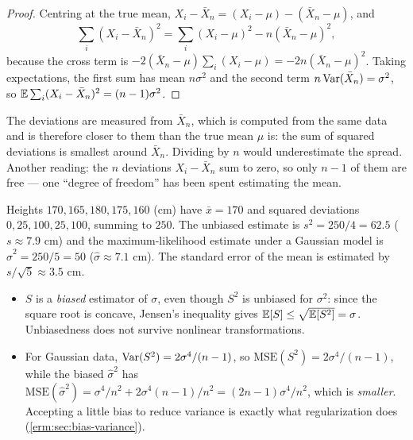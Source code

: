 \begin{notechapter}
\begin{proof}
Centring at the true mean, $X_i - \bar X_n = (X_i - \mu) - (\bar X_n - \mu)$, and
\[
  \sum_i(X_i - \bar X_n)^2 = \sum_i(X_i - \mu)^2 - n(\bar X_n - \mu)^2,
\]
because the cross term is $-2(\bar X_n - \mu)\sum_i(X_i - \mu) = -2n(\bar X_n - \mu)^2$.
Taking expectations, the first sum has mean $n\sigma^2$ and the second term
$n\operatorname{Var}(\bar X_n) = \sigma^2$, so $\mathbb{E}\sum_i(X_i - \bar X_n)^2 = (n-1)\sigma^2$.
\end{proof}

\begin{intuition}[Why $n - 1$?]
The deviations are measured from $\bar X_n$, which is computed from the same
data and is therefore closer to them than the true mean $\mu$ is: the sum of
squared deviations is smallest around $\bar X_n$. Dividing by $n$ would
underestimate the spread. Another reading: the $n$ deviations
$X_i - \bar X_n$ sum to zero, so only $n-1$ of them are free --- one
``degree of freedom'' has been spent estimating the mean.
\end{intuition}

\begin{example}\label{stats-and-proba:ex:five}
Heights $170, 165, 180, 175, 160$ (cm) have $\bar x = 170$ and squared
deviations $0, 25, 100, 25, 100$, summing to $250$. The unbiased estimate is
$s^2 = 250/4 = 62.5$ ($s\approx7.9$ cm) and the maximum-likelihood estimate
under a Gaussian model is $\hat\sigma^2 = 250/5 = 50$ ($\hat\sigma\approx7.1$ cm).
The standard error of the mean is estimated by $s/\sqrt5\approx3.5$ cm.
\end{example}

\begin{pitfall}
\begin{itemize}[nosep]
  \item $S$ is a \emph{biased} estimator of $\sigma$, even though $S^2$ is
        unbiased for $\sigma^2$: since the square root is concave, Jensen's
        inequality gives $\mathbb{E}[S]\leq\sqrt{\mathbb{E}[S^2]} = \sigma$. Unbiasedness does
        not survive nonlinear transformations.
  \item For Gaussian data, $\operatorname{Var}(S^2) = 2\sigma^4/(n-1)$, so
        $\mathrm{MSE}(S^2) = 2\sigma^4/(n-1)$, while the biased $\hat\sigma^2$
        has $\mathrm{MSE}(\hat\sigma^2) = \sigma^4/n^2 + 2\sigma^4(n-1)/n^2 = (2n-1)\sigma^4/n^2$,
        which is \emph{smaller}. Accepting a little bias to reduce variance is
        exactly what regularization does (\cref{erm:sec:bias-variance}).
\end{itemize}
\end{pitfall}


\end{notechapter}
